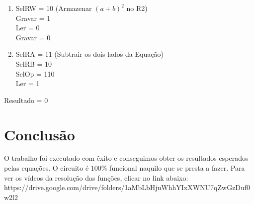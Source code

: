 \documentclass[]{article}
\begin{document}
\begin{enumerate}
			\item SelRW = 10 (Armazenar $(a+b)^2$ no R2)
			\\ Gravar = 1
			\\ Ler = 0
			\\ Gravar = 0
			
			\item SelRA = 11 (Subtrair os dois lados da Equação)
			\\ SelRB = 10
			\\ SelOp = 110
			\\ Ler = 1
		\end{enumerate}
		Resultado = 0
\section{Conclusão}
	O trabalho foi executado com êxito e conseguimos obter os resultados esperados pelas equações. O circuito é 100\% funcional naquilo que se presta a fazer.
	Para ver os vídeos da resolução das funções, clicar no link abaixo:
	\\
	https://drive.google.com/drive/folders/1aMbLbHjuWhhYIxXWNU7qZwGzDuf0w2l2
	

	
\end{document}
